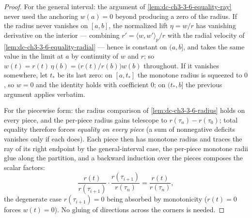 \begin{proof}
  \sketch

  For the general interval: the argument of
  \cref{lem:dc-ch3-3-6-equality-ray} never used the anchoring $w(a)=0$
  beyond producing a zero of the radius. If the radius never vanishes on
  $[a,b]$, the normalized lift $\eta=w/r$ has vanishing derivative on the
  interior — combining $r'=\langle w,w'\rangle_p/r$ with the radial velocity
  of \cref{lem:dc-ch3-3-6-equality-radial} — hence is constant on $(a,b]$,
  and takes the same value in the limit at $a$ by continuity of $w$ and $r$;
  so $w(t)=r(t)\,\eta(b)=\bigl(r(t)/r(b)\bigr)w(b)$ throughout. If it
  vanishes somewhere, let $t_*$ be its last zero: on $[a,t_*]$ the monotone
  radius is squeezed to $0$, so $w=0$ and the identity holds with
  coefficient $0$; on $(t_*,b]$ the previous argument applies verbatim.

  For the piecewise form: the radius comparison of
  \cref{lem:dc-ch3-3-6-radius} holds on every piece, and the per-piece
  radius gains telescope to $r(\tau_n)-r(\tau_0)$; total equality therefore
  forces \emph{equality on every piece} (a sum of nonnegative deficits
  vanishes only if each does). Each piece then has monotone radius and
  traces the ray of its right endpoint by the general-interval case, the
  per-piece monotone radii glue along the partition, and a backward
  induction over the pieces composes the scalar factors:
  $$\frac{r(t)}{r(\tau_{i+1})}\cdot\frac{r(\tau_{i+1})}{r(\tau_n)}
    =\frac{r(t)}{r(\tau_n)},$$
  the degenerate case $r(\tau_{i+1})=0$ being absorbed by monotonicity
  ($r(t)=0$ forces $w(t)=0$). No gluing of directions across the corners is
  needed.
\end{proof}

